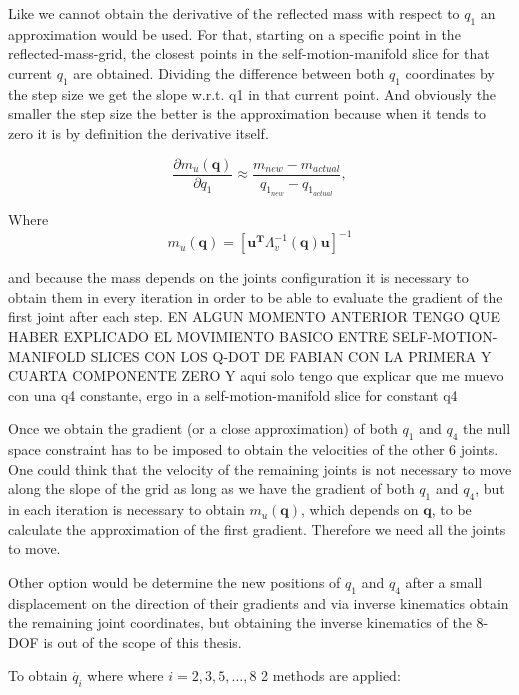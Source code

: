 Like we cannot obtain the derivative of the reflected mass with respect to $q_1$ an approximation would be used. For that, starting on a specific point in the reflected-mass-grid, the closest points in the self-motion-manifold slice for that current $q_1$ are obtained. Dividing the difference between both  $q_1$ coordinates by the step size we get the slope w.r.t. q1 in that current point. 
And obviously the smaller the step size the better is the approximation because when it tends to zero it is by definition the derivative itself.


\begin{equation}
\frac{\partial {m_u(\mathbf{q})}}{\partial {q_1}} \approx \frac{m_{new} - m_{actual}}{ q_{1_{new}} - q_{1_{actual}}}, \label{eq:approx_grad_q1}
\end{equation}

Where 
\begin{equation}
m_u(\mathbf{q}) = {[\mathbf{u^T} \Lambda_{v}^{-1}(\mathbf{q}) \mathbf{u}]^{-1}}
\end{equation}

and because the mass depends on the joints configuration it is necessary to obtain them in every iteration in order to be able to evaluate the gradient of the first joint after each step. {\color{red} EN ALGUN MOMENTO ANTERIOR TENGO QUE HABER EXPLICADO EL MOVIMIENTO BASICO ENTRE SELF-MOTION-MANIFOLD SLICES CON LOS Q-DOT DE FABIAN CON LA PRIMERA Y CUARTA COMPONENTE ZERO Y aqui solo tengo que explicar que me muevo con una q4 constante, ergo in a self-motion-manifold slice for constant q4}

Once we obtain the gradient (or a close approximation) of both $q_1$ and $q_4$ the null space constraint has to be imposed to obtain the velocities of the other 6 joints. One could think that the velocity of the remaining joints is not necessary to move along the slope of the grid as long as we have the gradient of both $q_1$ and $q_4$, but in each iteration is necessary to obtain $m_u (\mathbf{q})$, which depends on $\mathbf{q}$, to be calculate the approximation of the first gradient. Therefore we need all the joints to move. 

Other option would be determine the new positions of $q_1$ and $q_4$ after a small displacement on the direction of their gradients and via inverse kinematics obtain the remaining joint coordinates, but obtaining the inverse kinematics of the 8-DOF is out of the scope of this thesis.

To obtain $\dot{q_i}$ where where $i = 2,3,5, \dots, 8$ 2 methods are applied:

